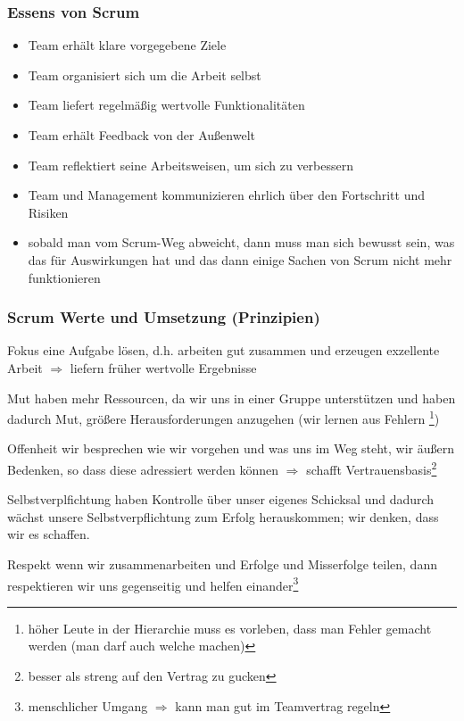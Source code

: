 \subsubsection{Essens von Scrum}
\begin{itemize}
  \item Team erhält klare vorgegebene Ziele
  \item Team organisiert sich um die Arbeit selbst
  \item Team liefert regelmäßig wertvolle Funktionalitäten
  \item Team erhält Feedback von der Außenwelt
  \item Team reflektiert seine Arbeitsweisen, um sich zu verbessern
  \item Team und Management kommunizieren ehrlich über den Fortschritt und Risiken
  \item sobald man vom Scrum-Weg abweicht, dann muss man sich bewusst sein, was das für
    Auswirkungen hat und das dann einige Sachen von Scrum nicht mehr funktionieren
\end{itemize}


\subsubsection{Scrum Werte und Umsetzung (Prinzipien)}

\begin{Beschreibungfett}[Selbstverplfichtung]
  \item [Fokus] eine Aufgabe lösen, d.h. arbeiten gut zusammen und erzeugen exzellente Arbeit
    $\Rightarrow$  liefern früher wertvolle Ergebnisse
\item [Mut] haben mehr Ressourcen, da wir uns in einer Gruppe unterstützen und haben dadurch Mut,
  größere Herausforderungen anzugehen (wir lernen aus Fehlern \footnote{höher Leute in der Hierarchie muss es vorleben, dass man
    Fehler gemacht werden (man darf auch welche machen)})
\item [Offenheit] wir   besprechen wie wir vorgehen und was uns im Weg steht, wir äußern
  Bedenken, so dass diese adressiert werden können $\Rightarrow$ schafft
Vertrauensbasis\footnote{besser als streng auf den Vertrag zu gucken}
  \item [Selbstverplfichtung] haben Kontrolle über unser eigenes Schicksal und dadurch wächst
    unsere Selbstverpflichtung zum Erfolg
    herauskommen; wir denken, dass wir es schaffen.
  \item [Respekt] wenn wir zusammenarbeiten und Erfolge und Misserfolge teilen, dann
    respektieren wir uns gegenseitig und helfen einander\footnote{menschlicher Umgang $\Rightarrow$
    kann man gut im Teamvertrag regeln}
\end{Beschreibungfett}


